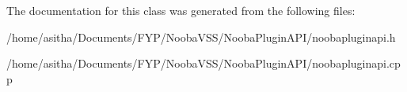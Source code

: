 The documentation for this class was generated from the following files\-:\begin{DoxyCompactItemize}
\item 
/home/asitha/\-Documents/\-F\-Y\-P/\-Nooba\-V\-S\-S/\-Nooba\-Plugin\-A\-P\-I/noobapluginapi.\-h\item 
/home/asitha/\-Documents/\-F\-Y\-P/\-Nooba\-V\-S\-S/\-Nooba\-Plugin\-A\-P\-I/noobapluginapi.\-cpp\end{DoxyCompactItemize}
